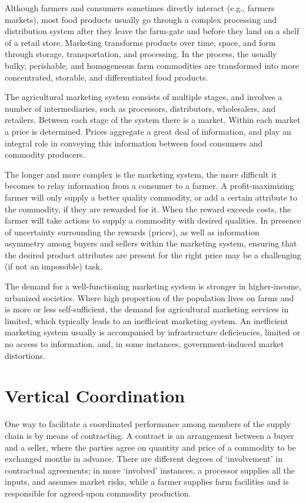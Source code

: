 \documentclass[
  oneside]{book}
\begin{document}
Although farmers and consumers sometimes directly interact (e.g., farmers markets), most food products usually go through a complex processing and distribution system after they leave the farm-gate and before they land on a shelf of a retail store. Marketing transforms products over time, space, and form through storage, transportation, and processing. In the process, the usually bulky, perishable, and homogeneous farm commodities are transformed into more concentrated, storable, and differentiated food products.

The agricultural marketing system consists of multiple stages, and involves a number of intermediaries, such as processors, distributors, wholesalers, and retailers. Between each stage of the system there is a market. Within each market a price is determined. Prices aggregate a great deal of information, and play an integral role in conveying this information between food consumers and commodity producers.

The longer and more complex is the marketing system, the more difficult it becomes to relay information from a consumer to a farmer. A profit-maximizing farmer will only supply a better quality commodity, or add a certain attribute to the commodity, if they are rewarded for it. When the reward exceeds costs, the farmer will take actions to supply a commodity with desired qualities. In presence of uncertainty surrounding the rewards (prices), as well as information asymmetry among buyers and sellers within the marketing system, ensuring that the desired product attributes are present for the right price may be a challenging (if not an impossible) task.

The demand for a well-functioning marketing system is stronger in higher-income, urbanized societies. Where high proportion of the population lives on farms and is more or less self-sufficient, the demand for agricultural marketing services in limited, which typically leads to an inefficient marketing system. An inefficient marketing system usually is accompanied by infrastructure deficiencies, limited or no access to information, and, in some instances, government-induced market distortions.

\hypertarget{vertical-coordination}{%
\section{Vertical Coordination}\label{vertical-coordination}}

One way to facilitate a coordinated performance among members of the supply chain is by means of contracting. A contract is an arrangement between a buyer and a seller, where the parties agree on quantity and price of a commodity to be exchanged months in advance. There are different degrees of `involvement' in contractual agreements; in more `involved' instances, a processor supplies all the inputs, and assumes market risks, while a farmer supplies farm facilities and is responsible for agreed-upon commodity production.
\end{document}
